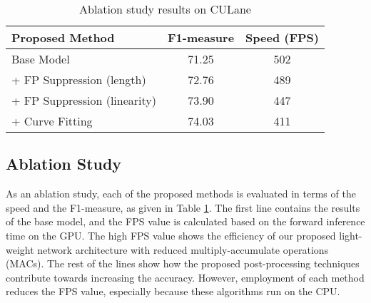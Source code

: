 \documentclass[conference]{IEEEtran}
\begin{document}
\begin{table}[t]
\caption{Ablation study results on CULane}
\vspace{-1ex}
\label{ta:Ablation}
\begin{center}
\normalsize
 \begin{tabular}{|@{}l|c|c|}  
 \hline
 \textbf{Proposed Method} & \textbf{F1-measure} & \textbf{Speed (FPS)}\\\hline
Base Model & 71.25 & 502 \\
 \hline
 + FP Suppression (length) & 72.76 & 489\\
 \hline
+ FP Suppression (linearity) & 73.90 & 447\\
 \hline
+ Curve Fitting & 74.03 & 411 \\
 \hline
\end{tabular} \end{center}
\vspace{-3ex}
\end{table}

\subsection{Ablation Study}
\label{ssec:ablation}

As an ablation study, each of the proposed methods is evaluated in terms of the speed and the F1-measure, as given in Table \ref{ta:Ablation}. The first line contains the results of the base model, and the FPS value is calculated based on the forward inference time on the GPU. The high FPS value shows the efficiency of our proposed light-weight network architecture with reduced multiply-accumulate operations (MACs). The rest of the lines show how the proposed post-processing techniques contribute towards increasing the accuracy. However, employment of each method reduces the FPS value, especially because these algorithms run on the CPU.
\end{document}
